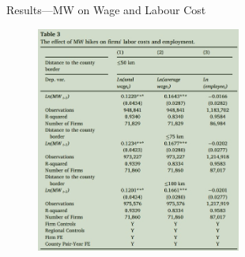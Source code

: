 \documentclass[aspectratio = 169]{beamer}
\begin{document}
    \begin{frame}{Results---MW on Wage and Labour Cost}
        \begin{figure}
            \centering
            \includegraphics[width = 0.6\textwidth, height = 0.9\textheight]{climate_change/beamer/wage_labor}
            \label{fig:wage-labour-mw}
        \end{figure}
    \end{frame}
\end{document}
